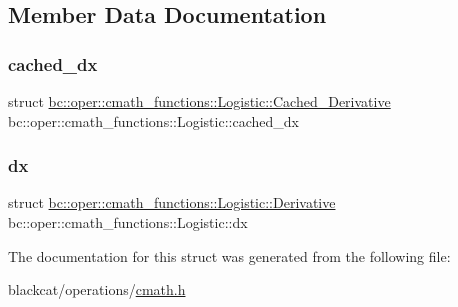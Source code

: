 \subsection{Member Data Documentation}
\mbox{\label{structbc_1_1oper_1_1cmath__functions_1_1Logistic_ac9b57c8b956597be63470e4f679a7cf1}} 
\subsubsection{\texorpdfstring{cached\+\_\+dx}{cached\_dx}}
{\footnotesize\ttfamily struct \hyperlink{structbc_1_1oper_1_1cmath__functions_1_1Logistic_1_1Cached__Derivative}{bc\+::oper\+::cmath\+\_\+functions\+::\+Logistic\+::\+Cached\+\_\+\+Derivative}   bc\+::oper\+::cmath\+\_\+functions\+::\+Logistic\+::cached\+\_\+dx}

\mbox{\label{structbc_1_1oper_1_1cmath__functions_1_1Logistic_adc7232e506cfd2f4302b4e3ef7583f3b}} 
\subsubsection{\texorpdfstring{dx}{dx}}
{\footnotesize\ttfamily struct \hyperlink{structbc_1_1oper_1_1cmath__functions_1_1Logistic_1_1Derivative}{bc\+::oper\+::cmath\+\_\+functions\+::\+Logistic\+::\+Derivative}   bc\+::oper\+::cmath\+\_\+functions\+::\+Logistic\+::dx}



The documentation for this struct was generated from the following file\+:\begin{DoxyCompactItemize}
\item 
blackcat/operations/\hyperlink{cmath_8h}{cmath.\+h}\end{DoxyCompactItemize}
